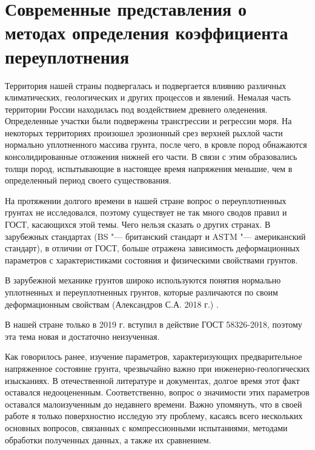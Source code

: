 \chapter{Современные представления о методах определения коэффициента переуплотнения}

Территория нашей страны подвергалась и подвергается влиянию различных климатических, геологических и других процессов и явлений. Немалая часть территории России находилась под воздействием древнего оледенения. Определенные участки были подвержены трансгрессии и регрессии моря. На некоторых территориях произошел эрозионный срез верхней рыхлой части нормально уплотненного массива грунта, после чего, в кровле пород обнажаются консолидированные отложения нижней его части. В связи с этим образовались толщи пород, испытывающие в настоящее время напряжения меньшие, чем в определенный период своего существования.

На протяжении долгого времени в нашей стране вопрос о переуплотненных грунтах не исследовался, поэтому существует не так много сводов правил и ГОСТ, касающихся этой темы. Чего нельзя сказать о других странах. 
В зарубежных стандартах (BS "--- британский стандарт и ASTM "--- американский стандарт), в отличии от ГОСТ, больше отражена зависимость деформационных параметров с характеристиками состояния и физическими свойствами грунтов.


В зарубежной механике грунтов широко используются понятия нормально уплотненных и переуплотненных грунтов, которые различаются по своим деформационным свойствам (Александров С.А. 2018 г.) \cite{aleksandrov2018}.

В нашей стране только в 2019 г. вступил в действие ГОСТ 58326-2018, поэтому эта тема новая и достаточно неизученная.

Как говорилось ранее, изучение параметров, характеризующих предварительное напряженное состояние грунта, чрезвычайно важно при инженерно-геологических изысканиях. В отечественной литературе и документах, долгое время этот факт оставался недооцененным. Соответственно, вопрос о значимости этих параметров оставался малоизученным до недавнего времени. Важно упомянуть, что в своей работе я только поверхностно исследую эту проблему,  касаясь всего нескольких основных вопросов, связанных с компрессионными испытаниями, методами обработки полученных данных, а также их сравнением.

